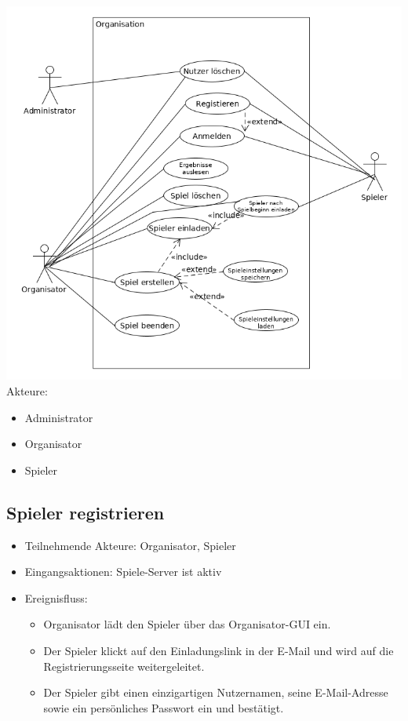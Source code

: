 \documentclass[a4paper]{scrreprt}
\begin{document}
    \includegraphics[width=\textwidth]{uml/export/Organisation.png}
    Akteure:
    \begin{itemize}
        \item \Gls{Administrator}
        \item \Gls{Organisator}
        \item \Gls{Spieler}
    \end{itemize}
    \newpage
   \subsection{Spieler registrieren}
    \begin{itemize}
        \item Teilnehmende Akteure: \Gls{Organisator}, \Gls{Spieler}
        \item Eingangsaktionen: Spiele-Server ist aktiv
        \item Ereignisfluss:
        \begin{itemize}
            \item \Gls{Organisator} lädt den \Gls{Spieler} über das Organisator-GUI ein.
            \item Der \Gls{Spieler} klickt auf den Einladungslink in der E-Mail und wird auf die Registrierungsseite weitergeleitet.
            \item Der \Gls{Spieler} gibt einen einzigartigen Nutzernamen, seine E-Mail-Adresse sowie ein persönliches Passwort ein und bestätigt.
        \end{itemize}
    \end{itemize}
\end{document}
